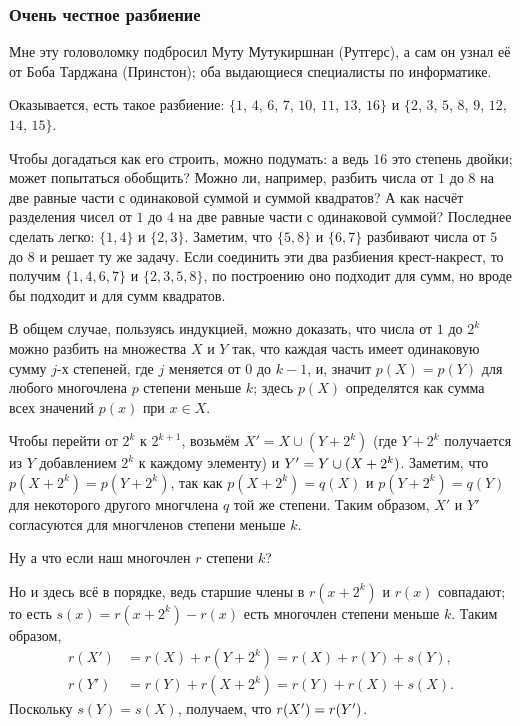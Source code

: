 \subsubsection*{Очень честное разбиение}

Мне эту головоломку подбросил Муту Мутукиршнан (Рутгерс),
а сам он узнал её от Боба Тарджана (Принстон);
оба выдающиеся специалисты по информатике.

Оказывается, есть такое разбиение: $\{1$, $4$, $6$, $7$, $10$, $11$, $13$, $16\}$ и $\{2$, $3$, $5$, $8$, $9$, $12$, $14$, $15\}$.

Чтобы догадаться как его строить, можно подумать:
а ведь $16$ это степень двойки;
может попытаться обобщить?
Можно ли, например, разбить числа от $1$ до $8$ на две равные части с одинаковой суммой и суммой квадратов?
А как насчёт разделения чисел от $1$ до $4$ на две равные части с одинаковой суммой?
Последнее сделать легко: $\{1, 4\}$ и $\{2, 3\}$.
Заметим, что $\{5, 8\}$ и $\{6, 7\}$ разбивают числа от $5$ до $8$ и решает ту же задачу.
Если соединить эти два разбиения крест-накрест, то получим $\{1, 4, 6, 7\}$ и $\{2, 3, 5, 8\}$, по построению оно подходит для сумм, но вроде бы подходит и для сумм квадратов.

В общем случае, пользуясь индукцией, можно доказать, что числа от $1$ до $2^k$ можно разбить на множества $X$ и $Y$ так, что каждая часть имеет одинаковую сумму $j$-х степеней, где $j$ меняется от $0$ до $k - 1$, и, значит $p(X)=p(Y)$ для любого многочлена $p$ степени меньше $k$;
здесь $p(X)$ определятся как сумма всех значений $p(x)$ при $x \in X$.

Чтобы перейти от $2^{k}$ к $2^{k+1}$, возьмём $X' = X \cup (Y + 2^k)$
(где $Y + 2^k$ получается из $Y$ добавлением $2^k$ к каждому элементу) и $Y' \z= Y \cup (X + 2^k)$.
Заметим, что $p(X + 2^k) = p(Y + 2^k)$,
так как $p(X + 2^k)=q(X)$ и $p(Y + 2^k)=q(Y)$ для некоторого другого многчлена $q$ той же степени.
Таким образом, $X'$ и $Y'$ согласуются для многчленов степени меньше $k$. 

Ну а что если наш многочлен $r$ степени $k$?

Но и здесь всё в порядке, ведь старшие члены в $r(x+2^k)$ и $r(x)$ совпадают;
то есть $s(x)=r(x+2^k)-r(x)$ есть многочлен степени меньше $k$.
Таким образом,
\begin{align*}
r(X')&=r(X)+r(Y+2^k)=r(X)+r(Y)+s(Y),
\\
r(Y')&=r(Y)+r(X+2^k)=r(Y)+r(X)+s(X).
\end{align*}
Поскольку $s(Y)=s(X)$, получаем, что $r(X')\z=r(Y')$.

